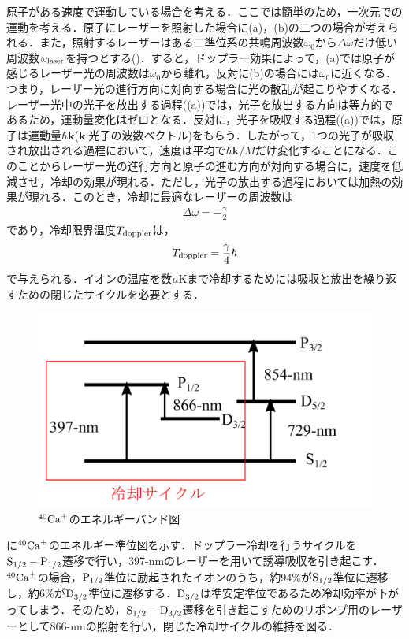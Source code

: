 原子がある速度で運動している場合を考える．ここでは簡単のため，一次元での運動を考える．原子にレーザーを照射した場合に(a)，(b)の二つの場合が考えられる．また，照射するレーザーはある二準位系の共鳴周波数$\omega_0$から$\Delta\omega $だけ低い周波数$\omega_{\rm laser}$を持つとする()．すると，ドップラー効果によって，(a)では原子が感じるレーザー光の周波数は$\omega_0$から離れ，反対に(b)の場合には$\omega_0$に近くなる．つまり，レーザー光の進行方向に対向する場合に光の散乱が起こりやすくなる．レーザー光中の光子を放出する過程((a))では，光子を放出する方向は等方的であるため，運動量変化はゼロとなる．反対に，光子を吸収する過程((a))では，原子は運動量$\hbar \bm{k}$($\bm{k}$:光子の波数ベクトル)をもらう．したがって，1つの光子が吸収され放出される過程において，速度は平均で$\hbar \bm{k}/M$だけ変化することになる．このことからレーザー光の進行方向と原子の進む方向が対向する場合に，速度を低減させ，冷却の効果が現れる．ただし，光子の放出する過程においては加熱の効果が現れる．このとき，冷却に最適なレーザーの周波数は
\large
\begin{align}
\Delta \omega = - \frac{\gamma}{2}
\end{align}
\normalsize
であり，冷却限界温度$T_{\rm doppler}$は，
\large
\begin{align}
T_{\rm doppler} = \frac{\gamma}{4}\hbar
\end{align}
\normalsize
で与えられる\cite{Wineland_1979}．イオンの温度を数$\mu$Kまで冷却するためには吸収と放出を繰り返すための閉じたサイクルを必要とする．

\begin{figure}[h]
	\begin{center}
		\includegraphics[width = 0.6\linewidth]{./theory/figure/Ca+_energy.png}
		\caption{$^{40}{\rm Ca}^+$のエネルギーバンド図}
		\label{fig:Ca+_energy}
	\end{center}
\end{figure}

に$^{40}{\rm Ca}^{+}$のエネルギー準位図を示す．ドップラー冷却を行うサイクルを${\rm S}_{1/2} - {\rm P}_{1/2}$遷移で行い，397-nmのレーザーを用いて誘導吸収を引き起こす．$^{40}{\rm Ca}^{+}$の場合，${\rm P}_{1/2}$準位に励起されたイオンのうち，約94\%が${\rm S}_{1/2}$準位に遷移し，約6\%が${\rm D}_{3/2}$準位に遷移する．${\rm D}_{3/2}$は準安定準位であるため冷却効率が下がってしまう．そのため，${\rm S}_{1/2} - {\rm D}_{3/2}$遷移を引き起こすためのリポンプ用のレーザーとして866-nmの照射を行い，閉じた冷却サイクルの維持を図る．
%
\clearpage
%
